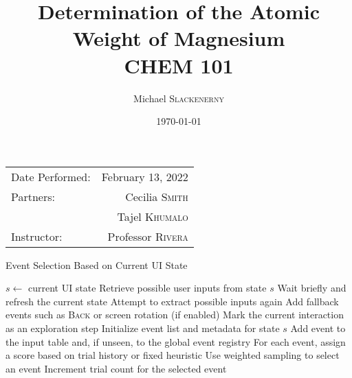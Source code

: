 \documentclass[
	letterpaper, %
	10pt, %
]{article} %
\title{Determination of the Atomic \\ Weight of Magnesium \\ CHEM 101}
\author{Michael \textsc{Slackenerny}}
\date{\today}
\begin{document}
\maketitle

\begin{center}
	\begin{tabular}{l r}
		Date Performed: & February 13, 2022 \\
		Partners: & Cecilia \textsc{Smith} \\
		& Tajel \textsc{Khumalo} \\
		Instructor: & Professor \textsc{Rivera}
	\end{tabular}
\end{center}

\begin{algorithm}
\caption{Event Selection Based on Current UI State}
\begin{algorithmic}[1]
\State $s \gets$ current UI state
    \State Retrieve possible user inputs from state $s$
        \State Wait briefly and refresh the current state
        \State Attempt to extract possible inputs again
    \EndWhile
    \State Add fallback events such as \textsc{Back} or screen rotation (if enabled)
    \State Mark the current interaction as an exploration step
    \State Initialize event list and metadata for state $s$
        \State Add event to the input table and, if unseen, to the global event registry
    \EndFor
    \State For each event, assign a score based on trial history or fixed heuristic
    \State Use weighted sampling to select an event
    \State Increment trial count for the selected event
\EndIf
\end{algorithmic}
\end{algorithm}
\end{document}
